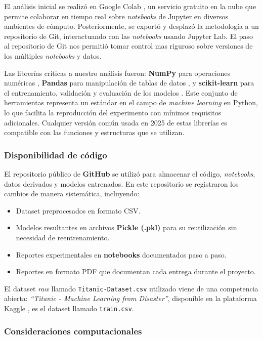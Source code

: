 \documentclass[conference]{IEEEtran}
\begin{document}
El análisis inicial se realizó en Google Colab \autocite{google-colab}, un servicio gratuito
en la nube que permite colaborar en tiempo real sobre \emph{notebooks} de Jupyter en diversos
ambientes de cómputo.  Posteriormente, se exportó y desplazó la metodología a un
repositorio de Git, interactuando con las \emph{notebooks} usando Jupyter Lab. El paso al
repositorio de Git nos permitió tomar control mas riguroso sobre versiones de los
múltiples \emph{notebooks} y datos.

Las librerías críticas a nuestro análisis fueron: \textbf{NumPy} para operaciones numéricas
\autocite{harris2020array}, \textbf{Pandas} para manipulación de tablas de datos
\autocite{reback2020pandas,mckinney-proc-scipy-2010}, y \textbf{scikit-learn} para el
entrenamiento, validación y evaluación de los modelos \autocite{scikit-learn}. Este conjunto
de herramientas representa un estándar en el campo de \emph{machine learning} en Python, lo que
facilita la reproducción del experimento con mínimos requisitos adicionales. Cualquier
versión común usada en 2025 de estas librerías es compatible con las funciones y
estructuras que se utilizan.
\subsubsection{Disponibilidad de código}
\label{sec:orgc518fa7}

El repositorio público de \textbf{GitHub} se utilizó para almacenar el código, \emph{notebooks},
datos derivados y modelos entrenados. En este repositorio se registraron los cambios de
manera sistemática, incluyendo:

\begin{itemize}
\item Dataset preprocesados en formato CSV.
\item Modelos resultantes en archivos \textbf{Pickle (.pkl)} para su reutilización sin necesidad de
reentrenamiento.
\item Reportes experimentales en \textbf{notebooks} documentados paso a paso.
\item Reportes en formato PDF que documentan cada entrega durante el proyecto.
\end{itemize}

El dataset \emph{raw} llamado \texttt{Titanic-Dataset.csv} utilizado viene de una competencia abierta:
\emph{“Titanic - Machine Learning from Disaster”}, disponible en la plataforma Kaggle
\autocite{titanic-kaggle}, es el dataset llamado \texttt{train.csv}.
\subsubsection{Consideraciones computacionales}
\label{sec:org82b26bb}
\end{document}

